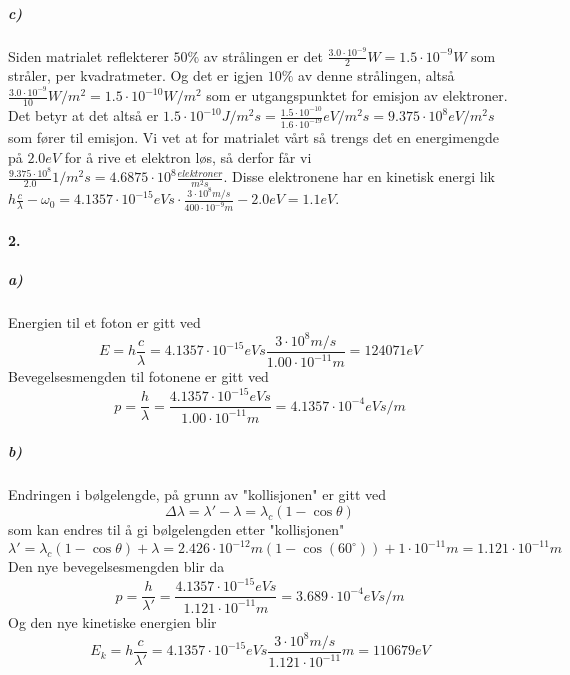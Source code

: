 \documentclass[11pt, A4paper,norsk]{article}
\begin{document}
			\subparagraph{c)}
				\begin{flushleft}
Siden matrialet reflekterer $50 \%$ av strålingen er det $\frac{3.0 \cdot 10^{-9}}{2} W = 1.5 \cdot 10^{-9} W$ som stråler, per kvadratmeter. Og det er igjen $10 \%$ av denne strålingen, altså $\frac{3.0 \cdot 10^{-9}}{10} W/m^2 = 1.5 \cdot 10^{-10} W/m^2$ som er utgangspunktet for emisjon av elektroner. Det betyr at det altså er $1.5 \cdot 10^{-10} J/m^2s = \frac{1.5 \cdot 10^{-10}}{ 1.6 \cdot 10^{-19}} eV/m^2s = 9.375 \cdot 10^8 eV/m^2s$ som fører til emisjon. Vi vet at for matrialet vårt så trengs det en energimengde på $2.0 eV$ for å rive et elektron løs, så derfor får vi $\frac{9.375 \cdot 10^8}{2.0} 1/m^2s = 4.6875 \cdot 10^{8} \frac{elektroner}{m^2 s}$. Disse elektronene har en kinetisk energi lik $h\frac{c}{\lambda} - \omega_0 = 4.1357 \cdot 10^{-15} eVs \cdot \frac{3 \cdot 10^8 m/s}{400 \cdot 10^{-9} m} - 2.0 eV = 1.1 eV$.
				\end{flushleft}









		\paragraph{2.}
			\subparagraph{a)}
				\begin{flushleft}
Energien til et foton er gitt ved $$E = h \frac{c}{\lambda} = 4.1357 \cdot 10^{-15} eVs \frac{3 \cdot 10^{8}m/s}{1.00 \cdot 10^{-11} m} = 124071eV$$ Bevegelsesmengden til fotonene er gitt ved $$p = \frac{h}{\lambda} = \frac{4.1357 \cdot 10^{-15} eVs}{1.00 \cdot 10^{-11} m} = 4.1357 \cdot 10^{-4} eVs/m$$
				\end{flushleft}









			\subparagraph{b)}
				\begin{flushleft}
Endringen i bølgelengde, på grunn av "kollisjonen" er gitt ved $$\Delta \lambda = \lambda' - \lambda = \lambda_c (1 - \cos \theta)$$ som kan endres til å gi bølgelengden etter "kollisjonen" $$\lambda' = \lambda_c (1 - \cos \theta) + \lambda = 2.426 \cdot 10^{-12} m(1 - \cos(60^{\circ})) + 1 \cdot 10^{-11} m = 1.121 \cdot 10^{-11} m$$ Den nye bevegelsesmengden blir da $$p = \frac{h}{\lambda'} = \frac{4.1357 \cdot 10^{-15} eVs}{1.121 \cdot 10^{-11} m} = 3.689 \cdot 10^{-4} eVs/m$$ Og den nye kinetiske energien blir $$E_k = h \frac{c}{\lambda'} = 4.1357 \cdot 10^{-15} eVs \frac{3 \cdot 10^{8}m/s}{1.121 \cdot 10^{-11}} m = 110679 eV$$
				\end{flushleft}
\end{document}
